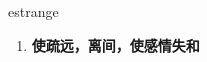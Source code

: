 
\begin{frame}
{\huge estrange}
\begin{center}
\begin{enumerate}\Large
  \item \textbf{使疏远，离间，使感情失和}
\end{enumerate}
\end{center}
\end{frame}

